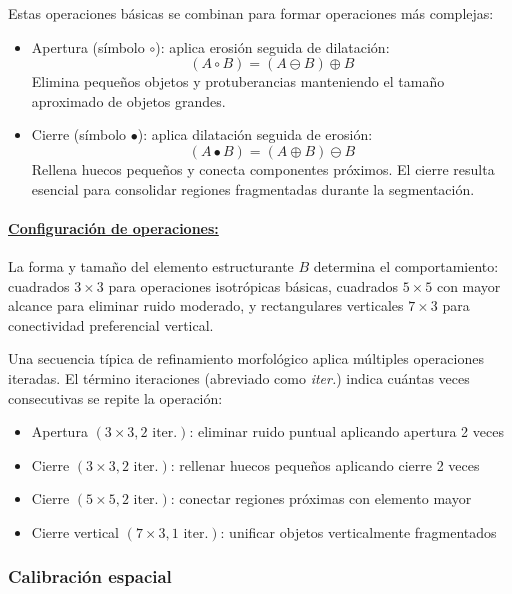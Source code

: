 Estas operaciones básicas se combinan para formar operaciones más complejas:

\begin{itemize}[label=$\bullet$]
\item Apertura (símbolo $\circ$): aplica erosión seguida de dilatación:
\begin{equation}
(A \circ B) = (A \ominus B) \oplus B
\end{equation}
Elimina pequeños objetos y protuberancias manteniendo el tamaño aproximado de objetos grandes.

\item Cierre (símbolo $\bullet$): aplica dilatación seguida de erosión:
\begin{equation}
(A \bullet B) = (A \oplus B) \ominus B
\end{equation}
Rellena huecos pequeños y conecta componentes próximos. El cierre resulta esencial para consolidar regiones fragmentadas durante la segmentación.
\end{itemize}

\paragraph{\underline{Configuración de operaciones:}}

La forma y tamaño del elemento estructurante $B$ determina el comportamiento: cuadrados $3 \times 3$ para operaciones isotrópicas básicas, cuadrados $5 \times 5$ con mayor alcance para eliminar ruido moderado, y rectangulares verticales $7 \times 3$ para conectividad preferencial vertical.

Una secuencia típica de refinamiento morfológico aplica múltiples operaciones iteradas. El término iteraciones (abreviado como \textit{iter.}) indica cuántas veces consecutivas se repite la operación:
\begin{itemize}[label=$\bullet$]
\item Apertura $(3 \times 3, 2 \text{ iter.})$: eliminar ruido puntual aplicando apertura 2 veces
\item Cierre $(3 \times 3, 2 \text{ iter.})$: rellenar huecos pequeños aplicando cierre 2 veces
\item Cierre $(5 \times 5, 2 \text{ iter.})$: conectar regiones próximas con elemento mayor
\item Cierre vertical $(7 \times 3, 1 \text{ iter.})$: unificar objetos verticalmente fragmentados
\end{itemize}

\subsubsection{Calibración espacial}

